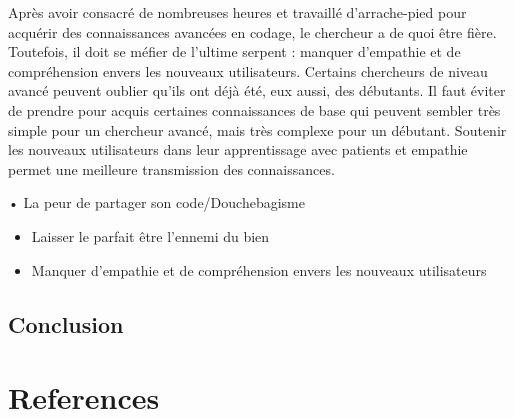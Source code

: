 \documentclass[
  letterpaper,
]{scrbook}
\begin{document}
Après avoir consacré de nombreuses heures et travaillé d'arrache-pied
pour acquérir des connaissances avancées en codage, le chercheur a de
quoi être fière. Toutefois, il doit se méfier de l'ultime serpent :
manquer d'empathie et de compréhension envers les nouveaux utilisateurs.
Certains chercheurs de niveau avancé peuvent oublier qu'ils ont déjà
été, eux aussi, des débutants. Il faut éviter de prendre pour acquis
certaines connaissances de base qui peuvent sembler très simple pour un
chercheur avancé, mais très complexe pour un débutant. Soutenir les
nouveaux utilisateurs dans leur apprentissage avec patients et empathie
permet une meilleure transmission des connaissances.

• La peur de partager son code/Douchebagisme

\begin{itemize}
\item
  Laisser le parfait être l'ennemi du bien
\item
  Manquer d'empathie et de compréhension envers les nouveaux
  utilisateurs
\end{itemize}

\hypertarget{conclusion-4}{%
\section{Conclusion}\label{conclusion-4}}


\hypertarget{references}{%
\chapter*{References}\label{references}}

\end{document}
